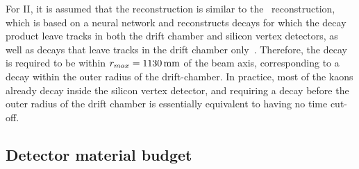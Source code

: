 For \belle II, it is assumed that the \KS reconstruction is similar to {}the \belle\ \KS reconstruction, which is based on a neural network and reconstructs \KS decays for which the decay product leave tracks in both the drift chamber and silicon vertex detectors, as well as decays that leave tracks in the drift chamber only~\cite{BelleKSPaper,BelleKSThesis}. Therefore, the \KS decay is required to be within $r_{max}=1130\text{\,mm}$ of the beam axis, corresponding to a decay within the outer radius of the drift-chamber. In practice, most of the kaons already decay inside the silicon vertex detector, and requiring a decay before the outer radius of the drift chamber is essentially equivalent to having no time cut-off.




\subsection{Detector material budget} %
\label{sub:detector_material_budget}

